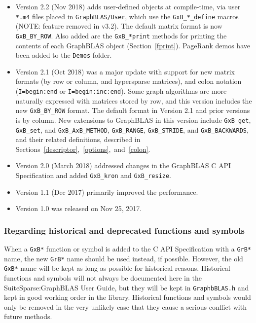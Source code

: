 \documentclass[12pt]{article}
\begin{document}
\begin{itemize}
\item
Version 2.2 (Nov 2018)
adds user-defined objects at compile-time, via user \verb'*.m4' files placed in
\verb'GraphBLAS/User', which use the \verb'GxB_*_define' macros 
(NOTE: feature removed in v3.2).
The default matrix format is now \verb'GxB_BY_ROW'.
Also added are the \verb'GxB_*print' methods for printing the contents of each
GraphBLAS object (Section~\ref{fprint}).   PageRank demos have been added to
the \verb'Demos' folder.

\item
Version 2.1 (Oct 2018) was
a major update with support for new matrix formats
(by row or column, and hypersparse matrices), and colon notation
(\verb'I=begin:end' or \verb'I=begin:inc:end').  Some graph algorithms are more
naturally expressed with matrices stored by row, and this version includes the
new \verb'GxB_BY_ROW' format.  The default format in Version 2.1 and
prior versions is by column.
New extensions to GraphBLAS in this version include \verb'GxB_get',
\verb'GxB_set', and \verb'GxB_AxB_METHOD', \verb'GxB_RANGE', \verb'GxB_STRIDE',
and \verb'GxB_BACKWARDS', and their related definitions, described in
Sections~\ref{descriptor},~\ref{options},~and~\ref{colon}.

\item
Version 2.0 (March 2018) addressed changes in the GraphBLAS C API
Specification and added \verb'GxB_kron' and \verb'GxB_resize'.

\item
Version 1.1 (Dec 2017) primarily improved the performance.

\item
Version 1.0 was released on Nov 25, 2017.
\end{itemize}

\subsubsection{Regarding historical and deprecated functions and symbols}

When a \verb'GxB*' function or symbol is added to the C API Specification with
a \verb'GrB*' name, the new \verb'GrB*' name should be used instead, if
possible.  However, the old \verb'GxB*' name will be kept as long as possible
for historical reasons.  Historical functions and symbols will not always be
documented here in the SuiteSparse:GraphBLAS User Guide, but they will be kept
in \verb'GraphbBLAS.h' and kept in good working order in the library.
Historical functions and symbols would only be removed in the very unlikely
case that they cause a serious conflict with future methods.
\end{document}
